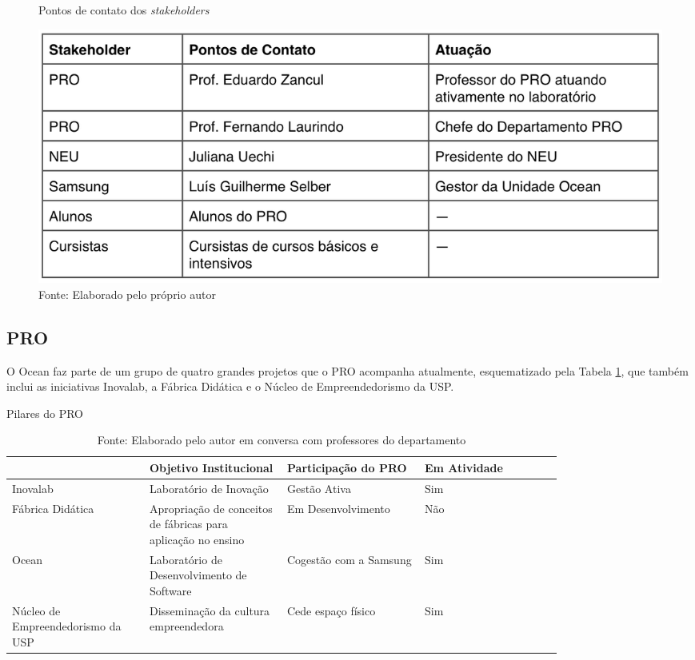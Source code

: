 \begin{figure}[H]
\caption{Pontos de contato dos \textit{stakeholders}}
\centerline{\includegraphics[scale=0.6]{img/stakeholderspoc}}
\label{fig:stakeholderspoc}
\caption* {Fonte: Elaborado pelo próprio autor}
\end{figure}


\subsection{PRO}
\label{sec:con_pro}

O Ocean faz parte de um grupo de quatro grandes projetos que o PRO acompanha atualmente, esquematizado pela Tabela \ref{tab:pilares_pro},  que também inclui as iniciativas Inovalab, a Fábrica Didática e o Núcleo de Empreendedorismo da USP.

\begin{table}[H]
\begin{center}
\caption{Pilares do PRO}
\label{tab:pilares_pro}
{\def\arraystretch{2}\tabcolsep=10pt
\begin{tabular}{>{\raggedright}p{0.2\linewidth}>{\raggedright\arraybackslash}p{0.2\linewidth}>{\raggedright\arraybackslash}p{0.2\linewidth}>{\raggedright\arraybackslash}p{0.2\linewidth}}
\hline
     & Objetivo Institucional & Participação do PRO & Em Atividade  \\ \hline
     Inovalab & Laboratório de Inovação & Gestão Ativa & Sim  \\
     Fábrica Didática & Apropriação de conceitos de fábricas para aplicação no ensino & Em Desenvolvimento & Não \\
     Ocean & Laboratório de Desenvolvimento de Software & Cogestão com a Samsung & Sim \\
	 Núcleo de Empreendedorismo da USP & Disseminação da cultura empreendedora & Cede espaço físico & Sim \\ \hline
\end{tabular}%
}
\caption* {Fonte: Elaborado pelo autor em conversa com professores do departamento}
\end{center}
\end{table}

